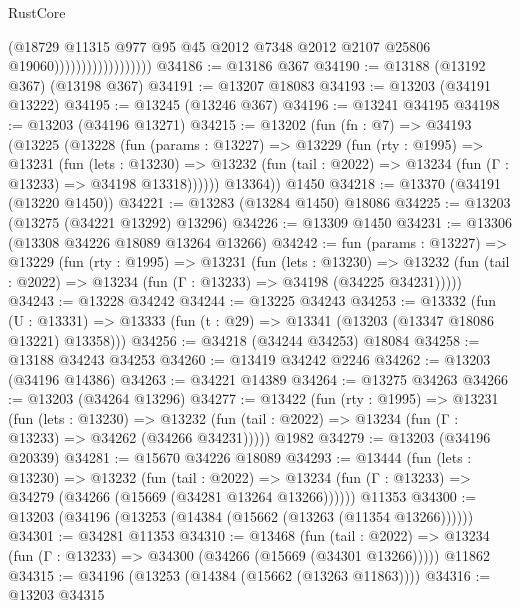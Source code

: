 \begin{lexlean}{RustCore}
\begin{coremodule}
                                      (@18729
                                        @11315
                                        @977
                                        @95
                                        @45
                                        @2012
                                        @7348
                                        @2012
                                        @2107
                                        @25806
                                        @19060))))))))))))))))))
@34186 := @13186 @367
@34190 := @13188 (@13192 @367) (@13198 @367)
@34191 := @13207 @18083
@34193 := @13203 (@34191 @13222)
@34195 := @13245 (@13246 @367)
@34196 := @13241 @34195
@34198 := @13203 (@34196 @13271)
@34215 := @13202
    (fun (fn : @7) =>
    @34193
      (@13225
        (@13228
          (fun (params : @13227) =>
          @13229
            (fun (rty : @1995) =>
            @13231
              (fun (lets : @13230) =>
              @13232 (fun (tail : @2022) => @13234 (fun (Γ : @13233) => @34198 @13318))))))
        @13364))
    @1450
@34218 := @13370 (@34191 (@13220 @1450))
@34221 := @13283 (@13284 @1450) @18086
@34225 := @13203 (@13275 (@34221 @13292) @13296)
@34226 := @13309 @1450
@34231 := @13306 (@13308 @34226 @18089 @13264 @13266)
@34242 := fun (params : @13227) =>
  @13229
    (fun (rty : @1995) =>
    @13231
      (fun (lets : @13230) =>
      @13232 (fun (tail : @2022) => @13234 (fun (Γ : @13233) => @34198 (@34225 @34231)))))
@34243 := @13228 @34242
@34244 := @13225 @34243
@34253 := @13332
    (fun (U : @13331) => @13333 (fun (t : @29) => @13341 (@13203 (@13347 @18086 @13221) @13358)))
@34256 := @34218 (@34244 @34253) @18084
@34258 := @13188 @34243 @34253
@34260 := @13419 @34242 @2246
@34262 := @13203 (@34196 @14386)
@34263 := @34221 @14389
@34264 := @13275 @34263
@34266 := @13203 (@34264 @13296)
@34277 := @13422
    (fun (rty : @1995) =>
    @13231
      (fun (lets : @13230) =>
      @13232 (fun (tail : @2022) => @13234 (fun (Γ : @13233) => @34262 (@34266 @34231)))))
    @1982
@34279 := @13203 (@34196 @20339)
@34281 := @15670 @34226 @18089
@34293 := @13444
    (fun (lets : @13230) =>
    @13232
      (fun (tail : @2022) =>
      @13234 (fun (Γ : @13233) => @34279 (@34266 (@15669 (@34281 @13264 @13266))))))
    @11353
@34300 := @13203 (@34196 (@13253 (@14384 (@15662 (@13263 (@11354 @13266))))))
@34301 := @34281 @11353
@34310 := @13468
    (fun (tail : @2022) => @13234 (fun (Γ : @13233) => @34300 (@34266 (@15669 (@34301 @13266)))))
    @11862
@34315 := @34196 (@13253 (@14384 (@15662 (@13263 @11863))))
@34316 := @13203 @34315

\end{coremodule}
\end{lexlean}
